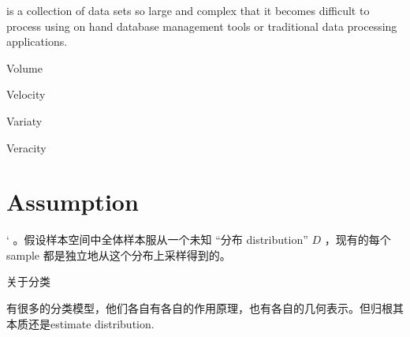 \documentclass[letterpaper,10pt,english]{sphinxmanual}
\begin{document}
\sphinxAtStartPar
{} is a collection of data sets so large and  complex that it becomes difficult to process using on\sphinxhyphen{}  hand database management tools or traditional data  processing applications.

\begin{DUlineblock}{0em}
\item[]  
\item[] Volume
\item[] Velocity
\item[] Variaty
\item[] Veracity
\end{DUlineblock}

\noindent{}


\section{Assumption}
\label{\detokenize{AI/main:assumption}}
\sphinxAtStartPar
{}  ` 。假设样本空间中全体样本服从一个未知 “分布 distribution” \(D\) ，现有的每个 sample 都是独立地从这个分布上采样得到的。

\begin{DUlineblock}{0em}
\item[] 关于分类
\item[] 有很多的分类模型，他们各自有各自的作用原理，也有各自的几何表示。但归根其本质还是estimate distribution.
\end{DUlineblock}
\end{document}

